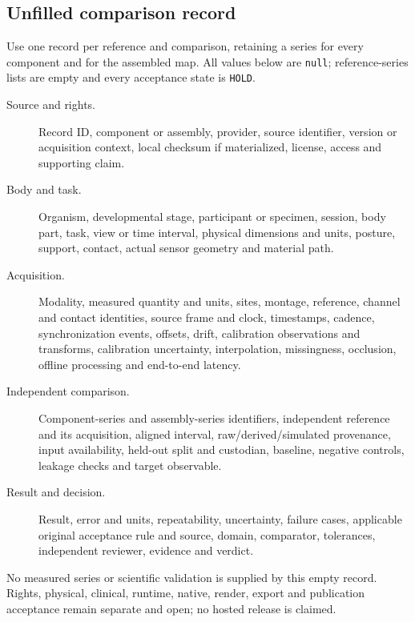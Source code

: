 \subsection*{Unfilled comparison record}

Use one record per reference and comparison, retaining a series for every
component and for the assembled map. All values below are \texttt{null};
reference-series lists are empty and every acceptance state is \texttt{HOLD}.

\begin{description}
\item[Source and rights.] Record ID, component or assembly, provider, source
identifier, version or acquisition context, local checksum if materialized,
license, access and supporting claim.
\item[Body and task.] Organism, developmental stage, participant or specimen,
session, body part, task, view or time interval, physical dimensions and units,
posture, support, contact, actual sensor geometry and material path.
\item[Acquisition.] Modality, measured quantity and units, sites, montage,
reference, channel and contact identities, source frame and clock, timestamps,
cadence, synchronization events, offsets, drift, calibration observations and
transforms, calibration uncertainty, interpolation, missingness, occlusion,
offline processing and end-to-end latency.
\item[Independent comparison.] Component-series and assembly-series identifiers,
independent reference and its acquisition, aligned interval, raw/derived/simulated
provenance, input availability, held-out split and custodian, baseline, negative
controls, leakage checks and target observable.
\item[Result and decision.] Result, error and units, repeatability, uncertainty,
failure cases, applicable original acceptance rule and source, domain,
comparator, tolerances, independent reviewer, evidence and verdict.
\end{description}

No measured series or scientific validation is supplied by this empty record.
Rights, physical, clinical, runtime, native, render, export and publication
acceptance remain separate and open; no hosted release is claimed.
